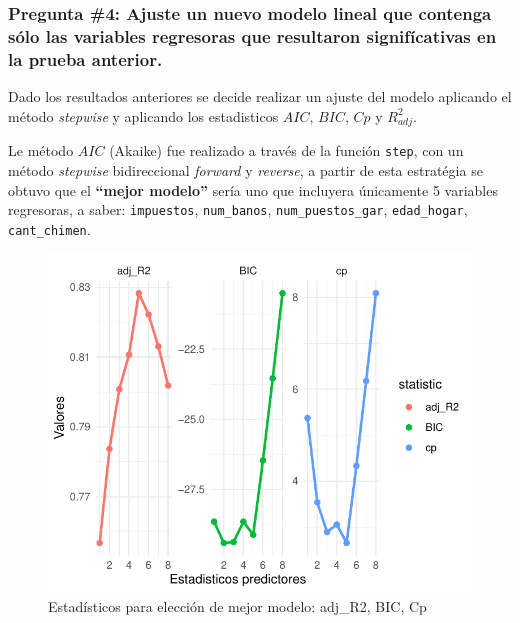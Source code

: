 \documentclass[
]{article}
\begin{document}
\hypertarget{pregunta-4-ajuste-un-nuevo-modelo-lineal-que-contenga-suxf3lo-las-variables-regresoras-que-resultaron-signifuxedcativas-en-la-prueba-anterior.}{%
\subsubsection{Pregunta \#4: Ajuste un nuevo modelo lineal que contenga
sólo las variables regresoras que resultaron signifícativas en la prueba
anterior.}\label{pregunta-4-ajuste-un-nuevo-modelo-lineal-que-contenga-suxf3lo-las-variables-regresoras-que-resultaron-signifuxedcativas-en-la-prueba-anterior.}}

Dado los resultados anteriores se decide realizar un ajuste del modelo
aplicando el método \emph{stepwise} y aplicando los estadisticos
\(AIC\), \(BIC\), \(Cp\) y \(R^2_{adj}\).

Le método \(AIC\) (Akaike) fue realizado a través de la función
\texttt{step}, con un método \emph{stepwise} bidireccional
\emph{forward} y \emph{reverse}, a partir de esta estratégia se obtuvo
que el \textbf{``mejor modelo''} sería uno que incluyera únicamente 5
variables regresoras, a saber: \texttt{impuestos}, \texttt{num\_banos},
\texttt{num\_puestos\_gar}, \texttt{edad\_hogar}, \texttt{cant\_chimen}.

\begin{figure}
\centering
\includegraphics{diagnosticorrpp_files/figure-latex/Gráfica de ESTADISTICOS para elección de mejor modelo-1.pdf}
\caption{Estadísticos para elección de mejor modelo: adj\_R2, BIC, Cp}
\end{figure}
\end{document}
